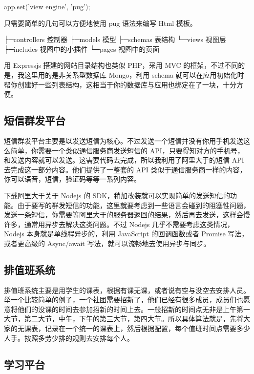 \begin{code}
app.set('view engine', 'pug');
\end{code}

只需要简单的几句可以方便地使用 pug 语法来编写 Html 模板。

\begin{code}
├─controllers   控制器
├─models        模型
├─schemas       表结构
└─views         视图层
    ├─includes  视图中的小插件
    └─pages     视图中的页面
\end{code}

用 Expressjs 搭建的网站目录结构也类似 PHP，采用 MVC 的框架，不过不同的是，我这里用的是非关系型数据库 Mongo，利用 schema 就可以在应用初始化时帮你创建好一些列表结构，这相当于你的数据库与应用也绑定在了一块，十分方便。

\subsection{短信群发平台}

短信群发平台主要是以发送短信为核心。不过发送一个短信并没有你用手机发送这么简单，你需要一个类似通信服务商发送短信的 API，只要得知对方的手机号，和发送内容就可以发送。这需要代码去完成，所以我利用了阿里大于的短信 API 去完成这一部分内容。他们提供了一整套的 API 类似于通信服务商一样的内容，你可以语音，短信，验证码等等一系列内容。

下载阿里大于关于 Nodejs 的 SDK，稍加改装就可以实现简单的发送短信的功能。由于要写的群发短信的功能，这里就要考虑到一些语言会碰到的阻塞性问题，发送一条短信，你需要等阿里大于的服务器返回的结果，然后再去发送，这样会慢许多，通常用异步去解决这类问题。不过 Nodejs 几乎不需要考虑这类情况，Nodejs 本身就是单线程异步的，利用 JavaScript 的回调函数或者 Promise 写法，或者更高级的 Async/await 写法，就可以流畅地去使用异步与同步。 

\subsection{排值班系统}

排值班系统主要是用学生的课表，根据有课无课，或者说有空与没空去安排人员。举一个比较简单的例子，一个社团需要招新了，他们已经有很多成员，成员们也愿意将他们的没课的时间去参加招新的时间上去。一般招新的时间点无非是上午第一大节，第二大节，中午，下午的第三大节，第四大节。所以具体算法就是，先将大家的无课表，记录在一个统一的课表上，然后根据配置，每个值班时间点需要多少人手。按照多劳少排的规则去安排每个人。

\subsection{学习平台}

